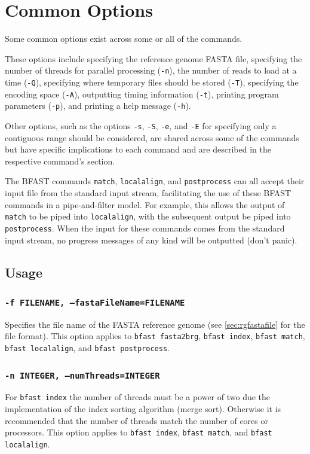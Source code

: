 \documentclass[a4paper,12pt]{book}
\newcommand{\TT}[1]{{\tt #1}} %
\begin{document}
\section{Common Options}
\label{sec:commonoptions}
Some common options exist across some or all of the commands. 

These options include specifying the reference genome FASTA file, specifying the number of threads for parallel processing (\TT{-n}), the number of reads to load at a time (\TT{-Q}), specifying where temporary files should be stored (\TT{-T}), specifying the encoding space (\TT{-A}), outputting timing information (\TT{-t}), printing program parameters (\TT{-p}), and printing a help message (\TT{-h}).

Other options, such as the options \TT{-s}, \TT{-S}, \TT{-e}, and \TT{-E} for specifying only a contiguous range should be considered, are shared across some of the commands but have specific implications to each command and are described in the respective command's section.

The BFAST commands \TT{match}, \TT{localalign}, and \TT{postprocess} can all accept their input file from the standard input stream, facilitating the use of these BFAST commands in a pipe-and-filter model.
For example, this allows the output of \TT{match} to be piped into \TT{localalign}, with the subsequent output be piped into \TT{postprocess}. 
When the input for these commands comes from the standard input stream, no progress messages of any kind will be outputted (don't panic).

\subsection{Usage}
\subsubsection{\TT{-f FILENAME, --fastaFileName=FILENAME}}
Specifies the file name of the FASTA reference genome (see \autoref{sec:rgfastafile} for the file format).
This option applies to \TT{bfast fasta2brg}, \TT{bfast index}, \TT{bfast match}, \TT{bfast localalign}, and \TT{bfast postprocess}.
\subsubsection{\TT{-n INTEGER, --numThreads=INTEGER}}
For \TT{bfast index} the number of threads must be a power of two due the implementation of the index sorting algorithm (merge sort).
Otherwise it is recommended that the number of threads match the number of cores or processors.
This option applies to \TT{bfast index}, \TT{bfast match}, and \TT{bfast localalign}. 
\end{document}
